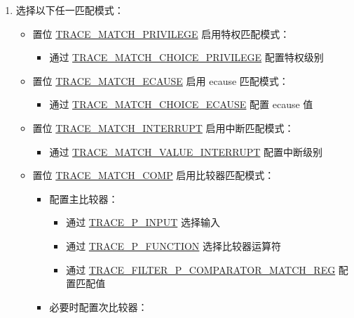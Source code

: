 \documentclass[main\_\_CN.tex]{subfiles}
\begin{document}
\begin{enumerate}
    \item 选择以下任一匹配模式：
        \begin{itemize}
            \item 置位 \hyperref[fielddesc:TRACEMATCHPRIVILEGE]{TRACE\_MATCH\_PRIVILEGE} 启用特权匹配模式：
                \begin{itemize}
                    \item 通过 \hyperref[fielddesc:TRACEMATCHCHOICEPRIVILEGE]{TRACE\_MATCH\_CHOICE\_PRIVILEGE} 配置特权级别
                \end{itemize}
            \item 置位 \hyperref[fielddesc:TRACEMATCHECAUSE]{TRACE\_MATCH\_ECAUSE} 启用 ecause 匹配模式：
                \begin{itemize}
                    \item 通过 \hyperref[fielddesc:TRACEMATCHCHOICEECAUSE]{TRACE\_MATCH\_CHOICE\_ECAUSE} 配置 ecause 值
                \end{itemize}
            \item 置位 \hyperref[fielddesc:TRACEMATCHINTERRUPT]{TRACE\_MATCH\_INTERRUPT} 启用中断匹配模式：
                \begin{itemize}
                    \item 通过 \hyperref[fielddesc:TRACEMATCHVALUEINTERRUPT]{TRACE\_MATCH\_VALUE\_INTERRUPT} 配置中断级别
                \end{itemize}
            \item 置位 \hyperref[fielddesc:TRACEMATCHCOMP]{TRACE\_MATCH\_COMP} 启用比较器匹配模式：
                \begin{itemize}
                    \item 配置主比较器：
                        \begin{itemize}
                            \item 通过 \hyperref[fielddesc:TRACEPINPUT]{TRACE\_P\_INPUT} 选择输入
                            \item 通过 \hyperref[fielddesc:TRACEPFUNCTION]{TRACE\_P\_FUNCTION} 选择比较器运算符
                            \item 通过 \hyperref[regdesc:TRACEFILTERPCOMPARATORMATCHREG]{TRACE\_FILTER\_P\_COMPARATOR\_MATCH\_REG} 配置匹配值
                        \end{itemize}
                    \item 必要时配置次比较器：
                        \begin{itemize}

\end{itemize}
\end{itemize}
\end{itemize}
\end{enumerate}
\end{document}
